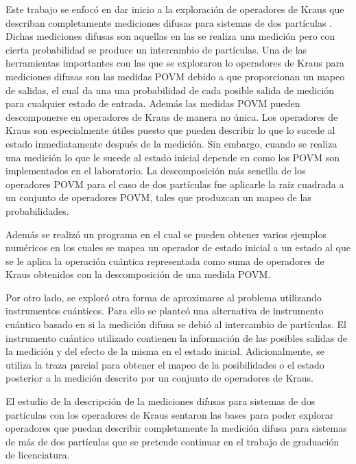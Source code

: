Este trabajo se enfocó en dar inicio a la exploración de operadores de Kraus que describan completamente mediciones difusas para sistemas de dos partículas 
. Dichas mediciones difusas son aquellas en las se realiza una medición pero con cierta probabilidad se produce un intercambio de partículas.    %
Una de las herramientas importantes con las que se exploraron lo operadores de Kraus para mediciones difusas son las medidas POVM debido a que proporcionan un mapeo de salidas, el cual da una una probabilidad de cada posible salida de medición para cualquier estado de entrada. Además las medidas POVM pueden descomponerse en operadores de Kraus de manera no única. Los operadores de Kraus son especialmente útiles puesto que pueden describir lo que lo sucede al estado inmediatamente después de la medición. Sin embargo, cuando se realiza una medición lo que le sucede al estado inicial depende en como los POVM son implementados en el laboratorio. La descomposición más sencilla de los operadores POVM para el caso de dos partículas fue aplicarle la raíz cuadrada a un conjunto de operadores POVM, tales que produzcan un mapeo de las probabilidades. 

Además se realizó un programa en el cual se pueden obtener varios ejemplos numéricos en los cuales se mapea un operador de estado inicial a un estado al que se le aplica la operación cuántica representada como suma de operadores de Kraus obtenidos con la descomposición de una medida POVM\@.

Por otro lado, se exploró otra forma de aproximarse al problema utilizando instrumentos cuánticos. Para ello se planteó una alternativa de instrumento cuántico basado en si la medición difusa se debió al intercambio de partículas. %
 El instrumento cuántico utilizado contienen la información de las posibles salidas de la medición  y del efecto de la misma en el estado inicial. Adicionalmente, se utiliza la traza parcial para obtener el mapeo de la posibilidades o el estado posterior a la medición descrito por un conjunto de operadores de Kraus.

El estudio de la descripción de la mediciones difusas para sistemas de dos partículas con los operadores de Kraus sentaron las bases para poder explorar operadores que puedan describir completamente la medición difusa para sistemas de más de dos partículas que se pretende continuar en el trabajo de graduación de licenciatura.
